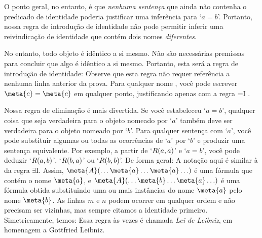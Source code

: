  O ponto geral, no entanto, \'e que \emph{nenhuma senten\c ca} que ainda n\~ao contenha o predicado de identidade poderia justificar uma infer\^encia para `$a=b$'. Portanto, nossa regra de introdu\c c\~ao de identidade n\~ao pode permitir inferir uma reivindica\c c\~ao de identidade que cont\'em dois nomes  \emph{diferentes}.

No entanto, todo objeto \'e id\^entico a si mesmo. N\~ao s\~ao necess\'arias premissas para concluir que algo \'e id\^entico a si mesmo. Portanto, esta ser\'a a regra de introdu\c c\~ao de identidade:
Observe que esta regra n\~ao requer refer\^encia a nenhuma linha anterior da prova. Para qualquer nome , voc\^e pode escrever $\meta{c}=\meta{c}$ em qualquer ponto, justificando apenas com a regra  {=}I .
 
Nossa regra de elimina\c c\~ao \'e mais divertida. Se voc\^e estabeleceu `$a=b$',  qualquer coisa que seja verdadeira para o objeto nomeado por `$a$' tamb\'em deve ser verdadeira para o objeto nomeado por `$b$'. Para qualquer senten\c ca com `$a$', voc\^e pode substituir algumas ou todas as ocorr\^encias de `$a$' por `$b$' e produzir uma senten\c ca equivalente. Por exemplo,  a partir de `$\mathord{R}(a,a)$' e `$a = b$',  voc\^e pode deduzir `$\mathord{R}(a,b)$', `$\mathord{R}(b,a)$' ou `$\mathord{R}(b,b)$'. De forma geral:
A nota\c c\~ao aqui \'e similar \`a da regra $\exists$I. Assim, $\meta{A}(\ldots \meta{a} \ldots \meta{a}\ldots)$ \'e uma f\'ormula que cont\'em o nome $\meta{a}$, e $\meta{A}(\ldots \meta{b} \ldots \meta{a}\ldots)$ \'e uma f\'ormula obtida substituindo uma ou mais inst\^ancias do nome $\meta{a}$ pelo nome $\meta{b}$. As linhas $m$ e $n$ podem ocorrer em qualquer ordem e n\~ao precisam ser vizinhas, mas sempre citamos a identidade primeiro. Simetricamente, temos:
Essa regra \`as vezes \'e chamada  \emph{Lei de Leibniz}, em homenagem a Gottfried Leibniz. 


